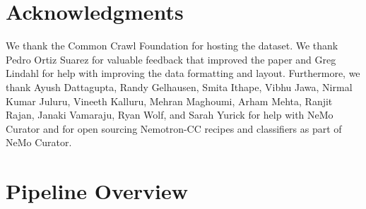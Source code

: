 \documentclass[11pt]{article}
\begin{document}
\section*{Acknowledgments}
We thank the Common Crawl Foundation for hosting the dataset. We thank Pedro Ortiz Suarez for valuable feedback that improved the paper and Greg Lindahl for help with improving the data formatting and layout. Furthermore, we thank Ayush Dattagupta, Randy Gelhausen, Smita Ithape, Vibhu Jawa, Nirmal Kumar Juluru, Vineeth Kalluru, Mehran Maghoumi, Arham Mehta, Ranjit Rajan, Janaki Vamaraju, Ryan Wolf, and Sarah Yurick for help with NeMo Curator and for open sourcing Nemotron-CC recipes and classifiers as part of NeMo Curator.



\newpage

\appendix

\section{Pipeline Overview}
\label{appendix:pipelineoverview}
\end{document}
